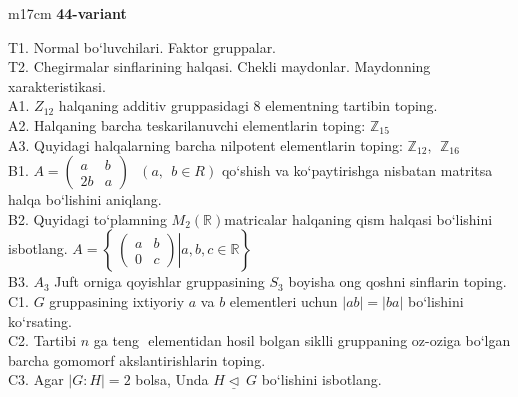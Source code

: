 \documentclass{article}
\begin{document}
\begin{tabular}{m{17cm}}
\textbf{44-variant}
\newline

T1. Normal bo`luvchilari. Faktor gruppalar. \\
T2. Chegirmalar sinflarining halqasi. Chekli maydonlar. Maydonning xarakteristikasi. \\
A1. \(Z_{12}\) halqaning additiv gruppasidagi 8 elementning tartibin toping. \\
A2. Halqaning barcha teskarilanuvchi elementlarin toping: \(\mathbb{Z}_{15}\) \\
A3. Quyidagi halqalarning barcha nilpotent elementlarin toping: \(\mathbb{Z}_{12},\ \ \mathbb{Z}_{16}\) \\
B1. \(A = \begin{pmatrix}
a & b \\
2b & a
\end{pmatrix}\ \ \ (a,\ \ b \in R)\) qo`shish va ko`paytirishga nisbatan matritsa halqa bo`lishini aniqlang. \\
B2. Quyidagi to`plamning \(M_{2}(\mathbb{R})\)matricalar halqaning qism halqasi bo`lishini isbotlang. \(A = \left\{ \left. \ \begin{pmatrix}
a & b \\
0 & c
\end{pmatrix} \right|a,b,c\mathbb{\in R} \right\}\) \\
B3. \(A_{3}\) Juft orniga qoyishlar gruppasining \(S_{3}\) boyisha o\textquotesingle ng qo\textquotesingle shni sinflarin toping. \\
C1. \(G\) gruppasining ixtiyoriy \(a\) va \(b\) elementleri uchun \(|ab| = |ba|\) bo`lishini ko`rsating. \\
C2. Tartibi \(n\) ga teng \(< a >\) elementidan hosil bo\textquotesingle lgan siklli gruppaning o\textquotesingle z-o\textquotesingle ziga bo`lgan barcha gomomorf akslantirishlarin toping. \\
C3. Agar \(|G:H| = 2\) bolsa, Unda \(H\underline{\vartriangleleft}\ G\) bo`lishini isbotlang. \\

\end{tabular}
\vspace{1cm}
\end{document}
